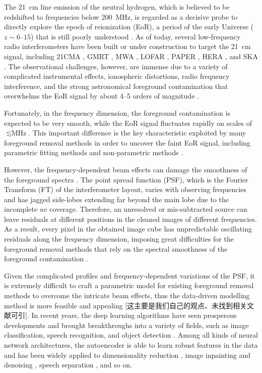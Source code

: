 \documentclass[letters,a4paper,fleqn,usenatbib]{mnras}
\begin{document}
The \SI{21}{\cm} line emission of the neutral hydrogen,
which is believed to be redshifted to frequencies below \SI{200}{\MHz},
is regarded as a decisive probe to directly explore the epoch of
reionization (EoR), a period of the early Universe
($z \sim \numrange{6}{15}$) that is still poorly understood
\citep[see][for reviews]{furlanetto2006rev,furlanetto2016rev}.
As of today, several low-frequency radio interferometers have been built
or under construction to target the \SI{21}{\cm} signal, including
21CMA \citep{zheng2016}, GMRT \citep{paciga2011}, MWA \citep{tingay2013},
LOFAR \citep{vanHaarlem2013}, PAPER \citep{parsons2010},
HERA \citep{deboer2017}, and SKA \citep{koopmans2015rev}.
The observational challenges, however, are immense due to a variety of
complicated instrumental effects, ionospheric distortions, radio frequency
interference, and the strong astronomical foreground contamination that
overwhelms the EoR signal by about \numrange{4}{5} orders of magnitude
\citep[see][for a review]{morales2010rev}.

Fortunately, in the frequency dimension, the foreground contamination
is expected to be very smooth, while the EoR signal fluctuates rapidly
on scales of $\lesssim \si{\MHz}$.
This important difference is the key characteristic exploited by many
foreground removal methods in order to uncover the faint EoR signal,
including
parametric fitting methods \citep[e.g.,][]{wang2006,liu2009fgrm,wang2013}
and non-parametric methods \citep[e.g.,][]{harker2009,chapman2013,mertens2018}.

However, the frequency-dependent beam effects can damage the smoothness
of the foreground spectra \citep{liu2009ps}.
The point spread function (PSF), which is the Fourier Transform (FT)
of the interferometer layout, varies with observing frequencies and
has jagged side-lobes extending far beyond the main lobe due to the
incomplete $uv$ coverage.
Therefore, an unresolved or mis-subtracted source can leave residuals
at different positions in the cleaned images of different frequencies.
As a result, every pixel in the obtained image cube has unpredictable
oscillating residuals along the frequency dimension, imposing great
difficulties for the foreground removal methods that rely on the
spectral smoothness of the foreground contamination
\citep[see also][]{liu2009ps}.

Given the complicated profiles and frequency-dependent variations of
the PSF, it is extremely difficult to craft a parametric model for
existing foreground removal methods to overcome the intricate beam
effects, thus the data-driven modelling method is more feasible and
appealing [这主要是我们自己的观点、未找到相关文献可引].
In recent years, the deep learning algorithms have seen prosperous
developments and brought breakthroughs into a variety of fields, such
as image classification, speech recognition, and object detection
\citep[see][for a recent review]{lecun2015}.
Among all kinds of neural network architectures, the autoencoder
is able to learn robust features in the data \citep{vincent2008}
and has been widely applied to
dimensionality reduction \citep{hinton2006},
image inpainting and denoising \citep{suganuma2018},
speech separation \citep{grais2017}, and so on.
\end{document}
